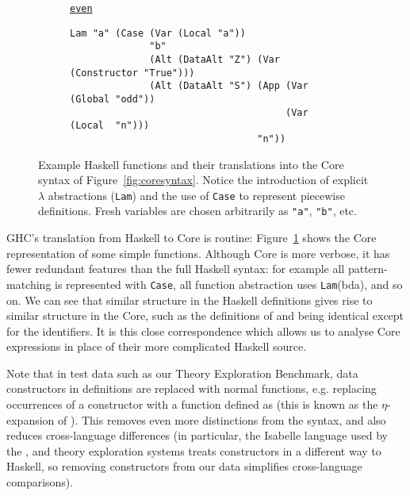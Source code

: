 \begin{figure}
\begin{subfigure}[odd]{\textwidth}
  \end{subfigure}
  \begin{subfigure}[even]{\textwidth}
    \begin{small}
      \underline{\texttt{even}}
      \begin{verbatim}
Lam "a" (Case (Var (Local "a"))
              "b"
              (Alt (DataAlt "Z") (Var (Constructor "True")))
              (Alt (DataAlt "S") (App (Var (Global "odd"))
                                      (Var (Local  "n")))
                                 "n"))
      \end{verbatim}
    \end{small}
  \end{subfigure}
  \caption{Example Haskell functions and their translations into the Core syntax
    of Figure~\ref{fig:coresyntax}. Notice the introduction of explicit
    $\lambda$ abstractions (\texttt{Lam}) and the use of \texttt{Case} to
    represent piecewise definitions. Fresh variables are chosen arbitrarily
    as \texttt{"a"}, \texttt{"b"}, etc.}
  \label{fig:coreexample}
\end{figure}

GHC's translation from Haskell to Core is routine: Figure~\ref{fig:coreexample}
shows the Core representation of some simple functions. Although Core is more
verbose, it has fewer redundant features than the full Haskell syntax: for
example all pattern-matching is represented with \texttt{Case}, all function
abstraction uses \texttt{Lam}(bda), and so on. We can see that similar structure
in the Haskell definitions gives rise to similar structure in the Core, such as
the definitions of  and  being identical except for the
identifiers. It is this close correspondence which allows us to analyse Core
expressions in place of their more complicated Haskell source.

Note that in test data such as our Theory Exploration Benchmark, data
constructors in definitions are replaced with normal functions, e.g. replacing
occurrences of a constructor  with a function  defined
as  (this is known as the $\eta$-expansion of ). This
removes even more distinctions from the syntax, and also reduces
cross-language differences (in particular, the Isabelle language used by the
\isascheme{}, \isacosy{} and \hipster{} theory exploration systems treats
constructors in a different way to Haskell, so removing constructors from our
data simplifies cross-language comparisons).

